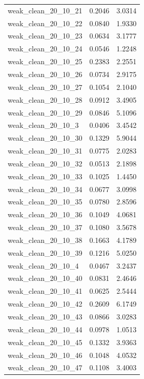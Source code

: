 \begin{longtable}{lcc}
weak\_clean\_20\_10\_21    &   0.2046 &  3.0314 \\
weak\_clean\_20\_10\_22    &   0.0840 &  1.9330 \\
weak\_clean\_20\_10\_23    &   0.0634 &  3.1777 \\
weak\_clean\_20\_10\_24    &   0.0546 &  1.2248 \\
weak\_clean\_20\_10\_25    &   0.2383 &  2.2551 \\
weak\_clean\_20\_10\_26    &   0.0734 &  2.9175 \\
weak\_clean\_20\_10\_27    &   0.1054 &  2.1040 \\
weak\_clean\_20\_10\_28    &   0.0912 &  3.4905 \\
weak\_clean\_20\_10\_29    &   0.0846 &  5.1096 \\
weak\_clean\_20\_10\_3     &   0.0406 &  3.4542 \\
weak\_clean\_20\_10\_30    &   0.1329 &  5.9044 \\
weak\_clean\_20\_10\_31    &   0.0775 &  2.0283 \\
weak\_clean\_20\_10\_32    &   0.0513 &  2.1898 \\
weak\_clean\_20\_10\_33    &   0.1025 &  1.4450 \\
weak\_clean\_20\_10\_34    &   0.0677 &  3.0998 \\
weak\_clean\_20\_10\_35    &   0.0780 &  2.8596 \\
weak\_clean\_20\_10\_36    &   0.1049 &  4.0681 \\
weak\_clean\_20\_10\_37    &   0.1080 &  3.5678 \\
weak\_clean\_20\_10\_38    &   0.1663 &  4.1789 \\
weak\_clean\_20\_10\_39    &   0.1216 &  5.0250 \\
weak\_clean\_20\_10\_4     &   0.0467 &  3.2437 \\
weak\_clean\_20\_10\_40    &   0.0831 &  2.4646 \\
weak\_clean\_20\_10\_41    &   0.0625 &  2.5444 \\
weak\_clean\_20\_10\_42    &   0.2609 &  6.1749 \\
weak\_clean\_20\_10\_43    &   0.0866 &  3.0283 \\
weak\_clean\_20\_10\_44    &   0.0978 &  1.0513 \\
weak\_clean\_20\_10\_45    &   0.1332 &  3.9363 \\
weak\_clean\_20\_10\_46    &   0.1048 &  4.0532 \\
weak\_clean\_20\_10\_47    &   0.1108 &  3.4003 \\

\end{longtable}
